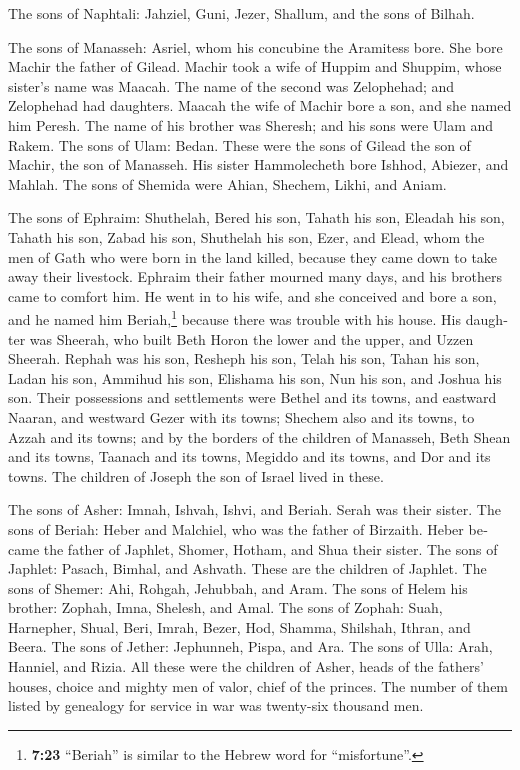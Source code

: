 \begin{paracol}{2}
\begin{otherlanguage}{english}
 The sons of Naphtali: Jahziel, Guni, Jezer, Shallum, and
the sons of Bilhah.

 The sons of Manasseh: Asriel, whom his concubine the
Aramitess bore. She bore Machir the father of Gilead. 
Machir took a wife of Huppim and Shuppim, whose sister's name was
Maacah. The name of the second was Zelophehad; and Zelophehad had
daughters.  Maacah the wife of Machir bore a son, and she
named him Peresh. The name of his brother was Sheresh; and his sons were
Ulam and Rakem.  The sons of Ulam: Bedan. These were the
sons of Gilead the son of Machir, the son of Manasseh. 
His sister Hammolecheth bore Ishhod, Abiezer, and Mahlah.
 The sons of Shemida were Ahian, Shechem, Likhi, and
Aniam.

 The sons of Ephraim: Shuthelah, Bered his son, Tahath
his son, Eleadah his son, Tahath his son,  Zabad his son,
Shuthelah his son, Ezer, and Elead, whom the men of Gath who were born
in the land killed, because they came down to take away their livestock.
 Ephraim their father mourned many days, and his brothers
came to comfort him.  He went in to his wife, and she
conceived and bore a son, and he named him Beriah,\footnote{\textbf{7:23}
  ``Beriah'' is similar to the Hebrew word for ``misfortune''.} because
there was trouble with his house.  His daughter was
Sheerah, who built Beth Horon the lower and the upper, and Uzzen
Sheerah.  Rephah was his son, Resheph his son, Telah his
son, Tahan his son,  Ladan his son, Ammihud his son,
Elishama his son,  Nun his son, and Joshua his son.
 Their possessions and settlements were Bethel and its
towns, and eastward Naaran, and westward Gezer with its towns; Shechem
also and its towns, to Azzah and its towns;  and by the
borders of the children of Manasseh, Beth Shean and its towns, Taanach
and its towns, Megiddo and its towns, and Dor and its towns. The
children of Joseph the son of Israel lived in these.

 The sons of Asher: Imnah, Ishvah, Ishvi, and Beriah.
Serah was their sister.  The sons of Beriah: Heber and
Malchiel, who was the father of Birzaith.  Heber became
the father of Japhlet, Shomer, Hotham, and Shua their sister.
 The sons of Japhlet: Pasach, Bimhal, and Ashvath. These
are the children of Japhlet.  The sons of Shemer: Ahi,
Rohgah, Jehubbah, and Aram.  The sons of Helem his
brother: Zophah, Imna, Shelesh, and Amal.  The sons of
Zophah: Suah, Harnepher, Shual, Beri, Imrah,  Bezer, Hod,
Shamma, Shilshah, Ithran, and Beera.  The sons of Jether:
Jephunneh, Pispa, and Ara.  The sons of Ulla: Arah,
Hanniel, and Rizia.  All these were the children of
Asher, heads of the fathers' houses, choice and mighty men of valor,
chief of the princes. The number of them listed by genealogy for service
in war was twenty-six thousand men.


\end{otherlanguage}
\end{paracol}
